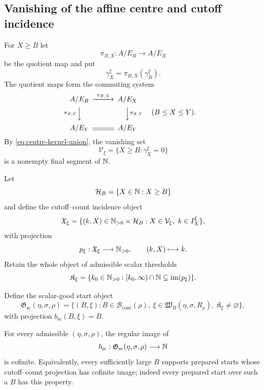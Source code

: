 \subsection{Vanishing of the affine centre and cutoff incidence}

For $X\ge B$ let
\[
\pi_{B,X}:A/E_B\longrightarrow A/E_X
\]
be the quotient map and put
\[
\gamma_X^\xi=\pi_{B,X}(\gamma_B^\xi).
\]
The quotient maps form the commuting system
\begin{equation}\label{eq:centre-transport-square}
\begin{CD}
A/E_B @>{\pi_{B,X}}>> A/E_X\\
@V{\pi_{B,Y}}VV @VV{\pi_{X,Y}}V\\
A/E_Y @= A/E_Y
\end{CD}
\qquad(B\le X\le Y).
\end{equation}
By \eqref{eq:centre-kernel-union}, the vanishing set
\[
\mathcal V_\xi=
\{X\ge B:\gamma_X^\xi=0\}
\]
is a nonempty final segment of $\mathbb N$.

Let
\[
\mathcal H_B=\{X\in\mathbb N:X\ge B\}
\]
and define the cutoff--count incidence object
\begin{equation}\label{eq:term-k}
\mathfrak X_\xi=
\{(k,X)\in\mathbb N_{>0}\times\mathcal H_B:
X\in\mathcal V_\xi,\ k\in I_X^\xi\},
\end{equation}
with projection
\[
p_\xi:\mathfrak X_\xi\longrightarrow\mathbb N_{>0},
\qquad
(k,X)\longmapsto k.
\]
Retain the whole object of admissible scalar thresholds
\begin{equation}\label{eq:scalar-threshold-object}
\mathfrak K_\xi=
\{k_0\in\mathbb N_{>0}:[k_0,\infty)\cap\mathbb N\subseteq\operatorname{im}(p_\xi)\}.
\end{equation}

Define the scalar-good start object
\begin{equation}\label{eq:scalar-good-start-object}
\mathfrak G_{\mathrm{sc}}(\eta,\sigma,\rho)
=
\{(B,\xi):B\in\mathcal B_{\mathrm{cont}}(\rho),\
\xi\in\mathfrak W_B(\eta,\sigma,R_\rho),\
\mathfrak K_\xi\ne\varnothing\},
\end{equation}
with projection $b_{\mathrm{sc}}(B,\xi)=B$.

\begin{theorem}\label{thm:scalar-terminality}
For every admissible $(\eta,\sigma,\rho)$, the regular image of
\[
b_{\mathrm{sc}}:
\mathfrak G_{\mathrm{sc}}(\eta,\sigma,\rho)
\longrightarrow\mathbb N
\]
is cofinite.  Equivalently, every sufficiently large $B$ supports prepared starts whose cutoff--count projection has cofinite image; indeed every prepared start over such a $B$ has this property.
\end{theorem}

